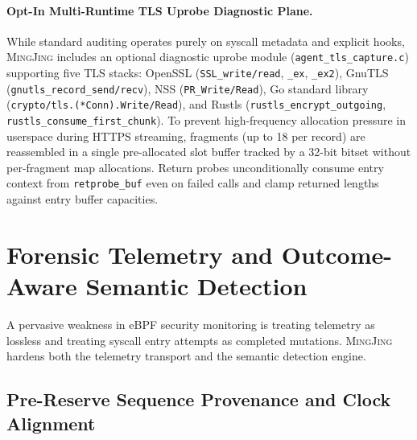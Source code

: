 \documentclass[10pt,twocolumn,letterpaper]{article}
\newcommand{\sys}{\textsc{MingJing}}
\newcommand{\code}[1]{\texttt{\small #1}}
\begin{document}
\paragraph{Opt-In Multi-Runtime TLS Uprobe Diagnostic Plane.} While standard auditing operates purely on syscall metadata and explicit hooks, \sys{} includes an optional diagnostic uprobe module (\code{agent\_tls\_capture.c}) supporting five TLS stacks: OpenSSL (\code{SSL\_write/read}, \code{\_ex}, \code{\_ex2}), GnuTLS (\code{gnutls\_record\_send/recv}), NSS (\code{PR\_Write/Read}), Go standard library (\code{crypto/tls.(*Conn).Write/Read}), and Rustls (\code{rustls\_encrypt\_outgoing}, \code{rustls\_consume\_first\_chunk}). To prevent high-frequency allocation pressure in userspace during HTTPS streaming, fragments (up to 18 per record) are reassembled in a single pre-allocated slot buffer tracked by a 32-bit bitset without per-fragment map allocations. Return probes unconditionally consume entry context from \code{retprobe\_buf} even on failed calls and clamp returned lengths against entry buffer capacities.

\section{Forensic Telemetry and Outcome-Aware Semantic Detection}
\label{sec:detection}

A pervasive weakness in eBPF security monitoring is treating telemetry as lossless and treating syscall entry attempts as completed mutations. \sys{} hardens both the telemetry transport and the semantic detection engine.

\subsection{Pre-Reserve Sequence Provenance and Clock Alignment}
\end{document}
